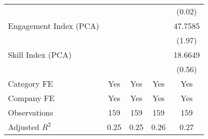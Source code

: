 {\begin{tabular}{l*{4}{c}}
                                   &                   &                   &                   &    (0.02)         \\
[1em]
Engagement Index (PCA)             &                   &                   &                   &   47.7585\sym{*}  \\
                                   &                   &                   &                   &    (1.97)         \\
[1em]
Skill Index (PCA)                  &                   &                   &                   &   18.6649         \\
                                   &                   &                   &                   &    (0.56)         \\
[1em]
Category FE                        &       Yes         &       Yes         &       Yes         &       Yes         \\
[1em]
Company FE                         &       Yes         &       Yes         &       Yes         &       Yes         \\
\hline
Observations                       &       159         &       159         &       159         &       159         \\
Adjusted \(R^{2}\)                 &      0.25         &      0.25         &      0.26         &      0.27         \\
\hline\hline
\end{tabular}
}
